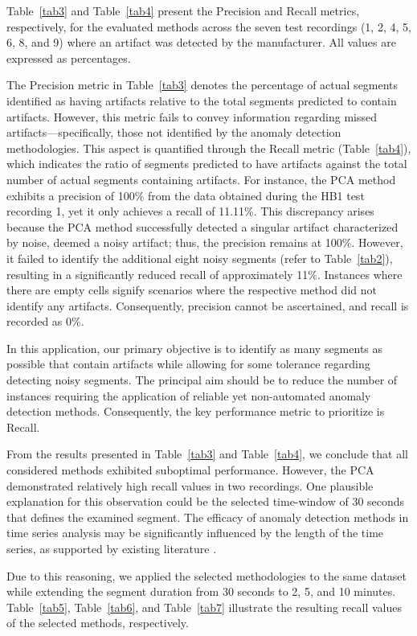 \documentclass[conference]{IEEEtran}
\begin{document}
Table~\ref{tab3} and Table~\ref{tab4} present the Precision and Recall metrics, respectively, for the evaluated methods across the seven test recordings (1, 2, 4, 5, 6, 8, and 9) where an artifact was detected by the manufacturer. All values are expressed as percentages.

The Precision metric in Table~\ref{tab3} denotes the percentage of
actual segments identified as having artifacts relative to the total
segments predicted to contain artifacts. However, this metric fails to
convey information regarding missed artifacts---specifically, those not
identified by the anomaly detection methodologies. This aspect is
quantified through the Recall metric (Table~\ref{tab4}), which
indicates the ratio of segments predicted to have artifacts against
the total number of actual segments containing artifacts. For
instance, the PCA method exhibits a precision of 100\% from the data
obtained during the HB1 test recording 1, yet it only achieves a
recall of 11.11\%. This discrepancy arises because the PCA method
successfully detected a singular artifact characterized by noise,
deemed a noisy artifact; thus, the precision remains at
100\%. However, it failed to identify the additional eight noisy
segments (refer to Table~\ref{tab2}), resulting in a significantly
reduced recall of approximately 11\%. Instances where there are empty
cells signify scenarios where the respective method did not identify
any artifacts. Consequently, precision cannot be ascertained, and
recall is recorded as 0\%.

In this application, our primary objective is to identify as many segments as possible that contain artifacts while allowing for some tolerance regarding detecting noisy segments. The principal aim should be to reduce the number of instances requiring the application of reliable yet non-automated anomaly detection methods. Consequently, the key performance metric to prioritize is Recall.

From the results presented in Table~\ref{tab3} and Table~\ref{tab4}, we conclude that all considered methods exhibited suboptimal performance. However, the PCA demonstrated relatively high recall values in two recordings. One plausible explanation for this observation could be the selected time-window of 30 seconds that defines the examined segment. The efficacy of anomaly detection methods in time series analysis may be significantly influenced by the length of the time series, as supported by existing literature \cite{Lee_2021}.

Due to this reasoning, we applied the selected methodologies to the same dataset while extending the segment duration from 30 seconds to 2, 5, and 10 minutes. Table~\ref{tab5}, Table~\ref{tab6}, and Table~\ref{tab7} illustrate the resulting recall values of the selected methods, respectively. 
\end{document}
